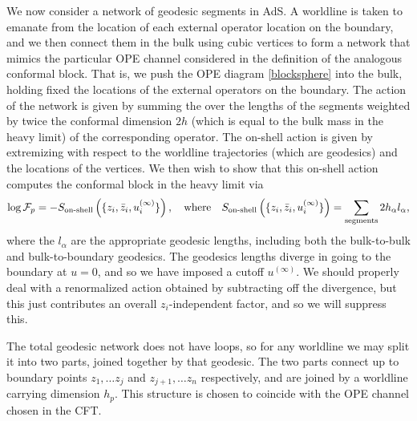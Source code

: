 \documentclass[12pt]{article}
\renewcommand{\inf}{{\infty}}
\begin{document}
We now consider a network of geodesic segments in AdS.  A worldline is taken to emanate from the location of each external operator location on the boundary, and we then connect them in the bulk using cubic vertices to form a network that mimics the particular OPE channel considered in the definition of the analogous conformal block.   That is, we push the OPE diagram \cref{blocksphere} into the bulk, holding fixed the locations of the external operators on the boundary.  The action of the network is given by summing the over the lengths of the segments weighted by twice the conformal dimension $2h$ (which is equal to  the bulk mass in the heavy limit) of the corresponding operator.  The on-shell action is given by extremizing with respect to the worldline trajectories (which are geodesics) and the locations of the vertices.  We then wish to show that this on-shell action computes the conformal block in the heavy limit via
\begin{equation}\label{onshell1}
\log\mathcal{F}_p=-S_\text{on-shell}\left(\{z_i,\bar{z}_i,u_i^{(\infty)}\}\right),
\quad \text{where}\quad
S_{\text{on-shell}}\left(\{z_i,\bar{z}_i,u_i^{(\infty)}\}\right)=\sum_{{\rm segments}} 2h_\alpha l_\alpha,
\end{equation}
where the $l_\alpha$ are the appropriate geodesic lengths,  including both the bulk-to-bulk and bulk-to-boundary geodesics.  The geodesics lengths diverge in going to the boundary at $u=0$, and so we have imposed a cutoff $u^{(\inf)}$.  We should properly deal with a renormalized action obtained by subtracting off the divergence, but this just contributes an overall $z_i$-independent factor, and so we will suppress this.

The total geodesic network does not have loops, so for any worldline we may split it into two parts, joined together by that geodesic. The two parts connect up to boundary points $z_{1}, \ldots z_j$ and $z_{j+1}, \ldots z_n$ respectively, and are joined by a worldline carrying dimension $h_p$.  This structure is chosen to coincide with the OPE channel chosen in the CFT.
\end{document}
